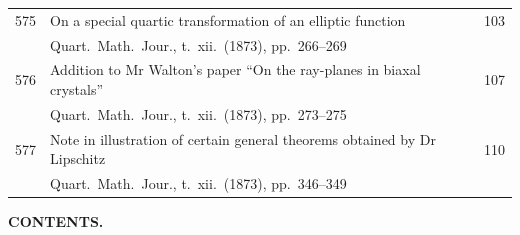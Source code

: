 \documentclass[12pt,a4paper]{article}
\theoremstyle{plain}
\theoremstyle{definition}
\begin{document}
\begin{longtable}{r @{. } p{4.8in} r}
575 & On a special quartic transformation of an elliptic function & 103 \\
  & Quart.\ Math.\ Jour., t.\ xii.\ (1873), pp.\ 266--269 & \\ 

576 & Addition to Mr Walton's paper ``On the ray-planes in biaxal crystals'' & 107 \\
  & Quart.\ Math.\ Jour., t.\ xii.\ (1873), pp.\ 273--275 & \\ 

577 & Note in illustration of certain general theorems obtained by Dr Lipschitz & 110 \\
  & Quart.\ Math.\ Jour., t.\ xii.\ (1873), pp.\ 346--349 & \\ 
\end{longtable}


\newpage

\begin{center}
{\large \textbf{CONTENTS.}}
\end{center}

\vspace{12pt}
\end{document}
